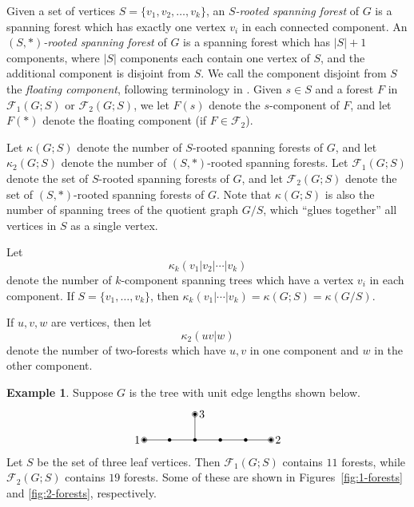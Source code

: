 \documentclass{amsart}
\theoremstyle{definition}
\newtheorem{eg}[thm]{Example}
\newcommand{\trees}{\mathcal{F}_1}
\newcommand{\forests}{\mathcal{F}}
\begin{document}
Given a set of vertices $S = \{v_1, v_2, \ldots, v_k\}$,
an {\em $S$-rooted spanning forest} of $G$ 
is a spanning forest which has exactly one vertex $v_i$ in each connected component.
An {\em $(S,*)$-rooted spanning forest} of $G$ is a spanning forest which has $|S|+1$ components, where $|S|$ components each contain one vertex of $S$, and the additional component is disjoint from $S$.
We call the component disjoint from $S$ the {\em floating component}, following terminology in \cite{kassel-kenyon-wu}.
Given $s \in S$ and a forest $F$ in $\trees(G; S)$ or $\forests_2(G; S)$, we let $F(s)$ denote the $s$-component of $F$, and let $F(*)$ denote the floating component (if $F \in \forests_2$).

Let $\kappa(G;S)$ denote the number of $S$-rooted spanning forests of $G$, and let $\kappa_2(G; S)$ denote the number of $(S,*)$-rooted spanning forests.
Let $\trees(G;S)$ denote the set of $S$-rooted spanning forests of $G$,
and let $\forests_2(G;S)$ denote the set of $(S,*)$-rooted spanning forests of $G$.
Note that $\kappa(G;S)$ is also the number of 
spanning trees of the quotient graph $G / S$, which ``glues together'' all vertices in $S$ as a single vertex.

Let 
\[
	\kappa_k(v_1|v_2| \cdots | v_k)
\]
denote the number of $k$-component spanning trees which have a vertex $v_i$ in each component.
If $S = \{v_1,\ldots, v_k\}$,
then $\kappa_k(v_1|\cdots| v_k) = \kappa(G; S) =  \kappa(G/S)$.

If $u, v, w$ are vertices, then let
\[
	\kappa_2(u v | w)
\]
denote the number of two-forests which have $u, v$ in one component and $w$ in the other component.

\begin{eg}
Suppose $G$ is the tree with unit edge lengths shown below.
\[
\begin{tikzpicture}[scale=0.8]
	\coordinate (1) at (0,0);
	\coordinate (A) at (1,0);
	\coordinate (B) at (2,0);
	\coordinate (C) at (3,0);
	\coordinate (D) at (4,0);
	\coordinate (2) at (5,0);
	\coordinate (3) at (2,1);
	
	\foreach \c in {1,2,3,A,B,C,D} {
		\fill (\c) circle (2pt);
	}
	\foreach \c in {1,2,3} {
		\draw (\c) circle (3pt);
	}

	\draw (1) -- (A);
	\draw (A) -- (B);
	\draw (B) -- (3);
	\draw (B) -- (C);
	\draw (C) -- (D);
	\draw (D) -- (2);
	
	\foreach \c/\d in {1/left,2/right,3/right} {
		\node[\d=0.2] at (\c) {$\c$};
	}
\end{tikzpicture}
\]
Let $S$ be the set of three leaf vertices.
Then $\trees(G;S)$ contains $11$ forests,
while $\forests_2(G;S)$ contains $19$ forests.
Some of these are shown in Figures~\ref{fig:1-forests} and \ref{fig:2-forests}, respectively.
\end{eg}
\end{document}
